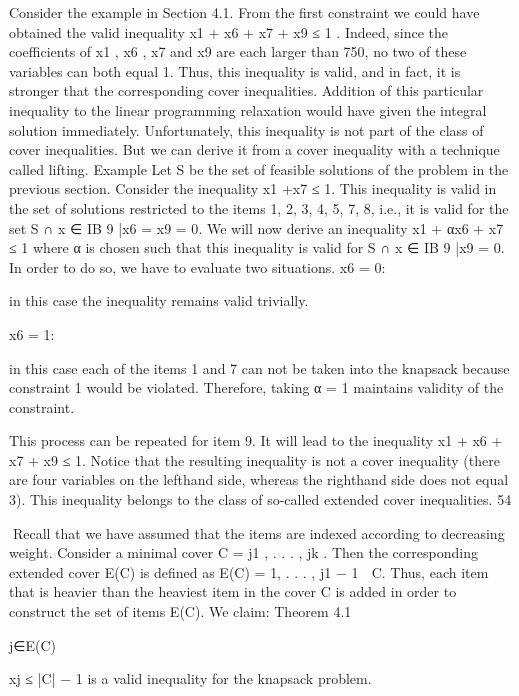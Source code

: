 Consider the example in Section 4.1. From the first constraint we could have obtained the valid inequality
x1 + x6 + x7 + x9 ≤ 1
. Indeed, since the coefficients of x1 , x6 , x7 and x9 are each larger than 750, no two of these variables
can both equal 1. Thus, this inequality is valid, and in fact, it is stronger that the corresponding cover
inequalities. Addition of this particular inequality to the linear programming relaxation would have
given the integral solution immediately. Unfortunately, this inequality is not part of the class of cover
inequalities. But we can derive it from a cover inequality with a technique called lifting.
Example Let S be the set of feasible solutions of the problem in the previous section. Consider the inequality x1 +x7 ≤ 1. This inequality is valid in the set of solutions restricted to the items {1, 2, 3, 4, 5, 7, 8},
i.e., it is valid for the set S ∩ {x ∈ IB 9 |x6 = x9 = 0}. We will now derive an inequality
x1 + αx6 + x7 ≤ 1
where α is chosen such that this inequality is valid for S ∩ {x ∈ IB 9 |x9 = 0}. In order to do so, we have
to evaluate two situations.
x6 = 0:

in this case the inequality remains valid trivially.

x6 = 1:

in this case each of the items 1 and 7 can not be taken into the knapsack because constraint 1
would be violated. Therefore, taking α = 1 maintains validity of the constraint.

This process can be repeated for item 9. It will lead to the inequality
x1 + x6 + x7 + x9 ≤ 1.
Notice that the resulting inequality is not a cover inequality (there are four variables on the lefthand side,
whereas the righthand side does not equal 3). This inequality belongs to the class of so-called extended
cover inequalities.
54

Recall that we have assumed that the items are indexed according to decreasing weight. Consider a
minimal cover C = {j1 , . . . , jk }. Then the corresponding extended cover E(C) is defined as
E(C) = {1, . . . , j1 − 1} ∪ C.
Thus, each item that is heavier than the heaviest item in the cover C is added in order to construct the
set of items E(C). We claim:
Theorem 4.1

j∈E(C)

xj ≤ |C| − 1 is a valid inequality for the knapsack problem.

